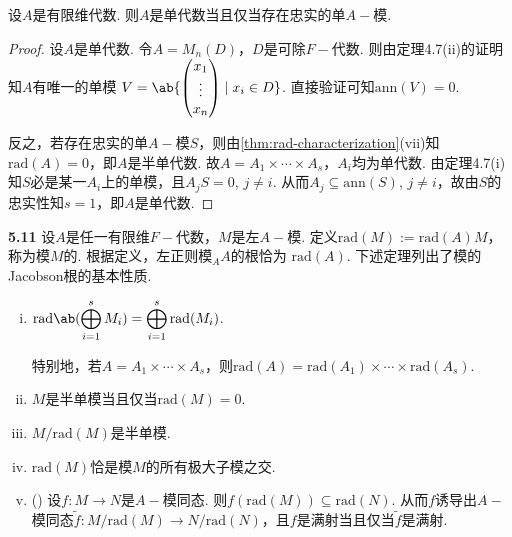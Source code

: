 \begin{theorem}
    设$A$是有限维代数. 则$A$是单代数当且仅当存在忠实的单$A-\!\!$模.
\end{theorem}

\begin{proof}
    设$A$是单代数. 令$A = M_n(D)$，$D$是可除$F-\!\!$代数. 则由定理4.7(ii)的证明知$A$有唯一的单模
    $V = \ab\{\begin{pmatrix} x_1 \\ \vdots \\ x_n \end{pmatrix} \mid x_i \in D\}$.
    直接验证可知$\mathrm{ann}(V) = 0$.\par
    反之，若存在忠实的单$A-\!\!$模$S$，则由\cref{thm:rad-characterization}(vii)知$\mathrm{rad}(A)
    = 0$，即$A$是半单代数. 故$A = A_1 \times \cdots \times A_s$，$A_i$均为单代数. 由定理4.7(i)
    知$S$必是某一$A_i$上的单模，且$A_j S = 0$, $j \neq i$. 从而$A_j \subseteq \mathrm{ann}(S)$,
    $j \neq i$，故由$S$的忠实性知$s = 1$，即$A$是单代数.
\end{proof}

\textbf{5.11} 设$A$是任一有限维$F-\!\!$代数，$M$是左$A-\!\!$模. 定义$\mathrm{rad}(M) :=
\mathrm{rad}(A)M$，称为模$M$的. 根据定义，左正则模${}_A A$的根恰为
$\mathrm{rad}(A)$. 下述定理列出了模的Jacobson根的基本性质.

\begin{theorem}
    \begin{enumerate}[(i)]
        \item $\displaystyle\mathrm{rad}\ab(\bigoplus_{i=1}^s M_i) = \bigoplus_{i=1}^s
        \mathrm{rad}(M_i)$.\par
        特别地，若$A = A_1 \times \cdots \times A_s$，则$\mathrm{rad}(A) = \mathrm{rad}(A_1) \times
        \cdots \times \mathrm{rad}(A_s)$.
        \item $M$是半单模当且仅当$\mathrm{rad}(M) = 0$.
        \item $M/\mathrm{rad}(M)$是半单模.
        \item $\mathrm{rad}(M)$恰是模$M$的所有极大子模之交.
        \item () 设$f: M \longrightarrow N$是$A-\!\!$模同态. 则$f(\mathrm{rad}(M))
        \subseteq \mathrm{rad}(N)$. 从而$f$诱导出$A-\!\!$模同态$\tilde{f}: M/\mathrm{rad}(M)
        \longrightarrow N/\mathrm{rad}(N)$，且$f$是满射当且仅当$\tilde{f}$是满射.
    \end{enumerate}
\end{theorem}

